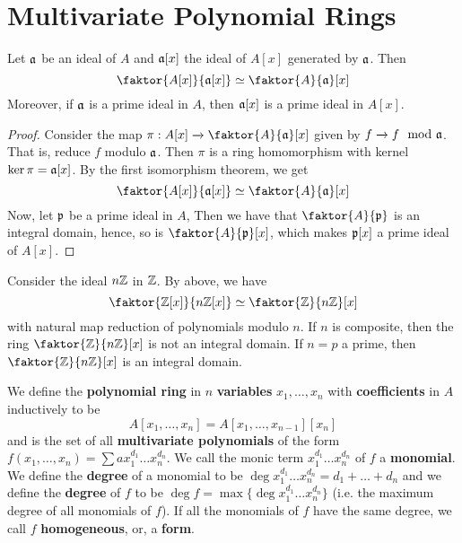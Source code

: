 \section{Multivariate Polynomial Rings}

\begin{theorem}\label{1.11.1}
    Let $\mathfrak{a}$ be an ideal of  $A$ and $\mathfrak{a}[x]$ the ideal of $A[x]$ generated by
    $\mathfrak{a}$. Then
    \begin{equation*}
        \faktor{A[x]}{\af[x]} \simeq \faktor{A}{\af}[x]
    \end{equation*}
    Moreover, if $\mathfrak{a}$ is a prime ideal in $A$, then $\mathfrak{a}[x]$ is a prime ideal in
    $A[x]$.
\end{theorem}
\begin{proof}
    Consider the map $\pi:A[x] \xrightarrow{} \faktor{A}{\af}[x]$ given by $f
    \xrightarrow{} f \mod{\mathfrak{a}}$. That is, reduce $f$ modulo  $\mathfrak{a}$.  Then $\pi$ is a
    ring homomorphism with kernel $\ker{\pi}=\mathfrak{a}[x]$. By the first isomorphism
    theorem, we get
    \begin{equation*}
        \faktor{A[x]}{\af[x]} \simeq \faktor{A}{\af}[x]
    \end{equation*}
    Now, let $\mathfrak{p}$ be a prime ideal in $A$, Then we have that $\faktor{A}{\pf}$ is
    an integral domain, hence, so is $\faktor{A}{\pf}[x]$, which makes $\mathfrak{p}[x]$ a
    prime ideal of $A[x]$.
\end{proof}

\begin{example}\label{1.1}
    Consider the ideal $n\mathbb{Z}$ in  $\mathbb{Z}$. By above, we have
    \begin{equation*}
        \faktor{\Z[x]}{n\Z[x]} \simeq \faktor{\Z}{n\Z}[x]
    \end{equation*}
    with natural map reduction of polynomials modulo $n$. If $n$ is composite,
    then the ring $\faktor{\Z}{n\Z}[x]$ is not an integral domain. If $n=p$ a
    prime, then  $\faktor{\Z}{n\Z}[x]$ is an integral domain.
\end{example}

\begin{definition}
    We define the \textbf{polynomial ring} in $n$  \textbf{variables} $x_1,
    \dots, x_n$ with \textbf{coefficients} in $A$ inductively to be
    \begin{equation*}
        A[x_1, \dots, x_n]=A[x_1, \dots, x_{n-1}][x_n]
    \end{equation*}
    and is the set of all \textbf{multivariate polynomials} of the form $f(x_1,
    \dots,x_n)=\sum{ax_1^{d_1} \dots x_n^{d_n}}$. We call the monic term
    $x_1^{d_1} \dots x_n^{d_n}$ of $f$ a  \textbf{monomial}. We define the
    \textbf{degree} of a monomial to be $\deg{x_1^{d_1} \dots
    x_n^{d_n}}=d_1+\dots+d_n$ and we define the \textbf{degree} of $f$ to be
    $\deg{f}=\max{\{\deg{x_1^{d_1} \dots x_n^{d_n}}\}}$ (i.e. the maximum degree
    of all monomials of $f$). If all the monomials of $f$ have the same degree,
    we call  $f$  \textbf{homogeneous}, or, a \textbf{form}.
\end{definition}

